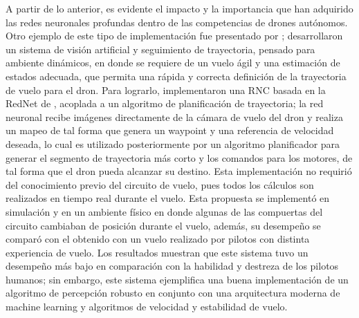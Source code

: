 A partir de lo anterior, es evidente el impacto y la importancia que han adquirido las redes neuronales profundas dentro de las competencias de drones autónomos. Otro ejemplo de este tipo de implementación fue presentado por \citet{kaufmann2018deep};  desarrollaron un sistema de visión artificial y seguimiento de trayectoria, pensado para ambiente dinámicos, en donde se requiere de un vuelo ágil y una estimación de estados adecuada, que permita una rápida y correcta definición de la trayectoria de vuelo para el dron. 
Para lograrlo, implementaron una RNC basada en la RedNet de \citet{loquercio2018dronet}, acoplada a un algoritmo de planificación de trayectoria; la red neuronal recibe imágenes directamente de la cámara de vuelo del dron y realiza un mapeo de tal forma que genera un waypoint y una referencia de velocidad deseada, lo cual es utilizado posteriormente por un algoritmo planificador para generar el segmento de trayectoria más corto y los comandos para los motores, de tal forma que el dron pueda alcanzar su destino. Esta implementación no requirió del conocimiento previo del circuito de vuelo, pues todos los cálculos son realizados en tiempo real durante el vuelo. Esta propuesta se implementó en simulación y en un ambiente físico en donde algunas de las compuertas del circuito cambiaban de posición durante el vuelo, además, su desempeño se comparó con el obtenido con un vuelo realizado por pilotos con distinta experiencia de vuelo. Los resultados muestran que este sistema tuvo un desempeño más bajo en comparación con la habilidad y destreza de los pilotos humanos; sin embargo, este sistema ejemplifica una buena implementación de un algoritmo de percepción robusto en conjunto con una arquitectura moderna de machine learning y algoritmos de velocidad y estabilidad de vuelo. 

